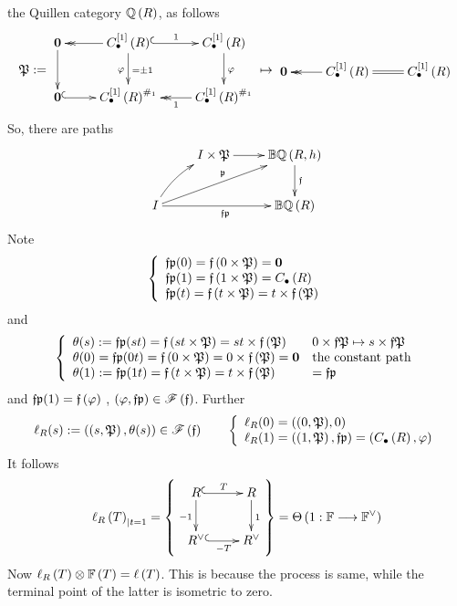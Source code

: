 \documentclass[12pt]{article}
\begin{document}
 the Quillen category  ${\BQ}\LRf{R}$, as follows
 $$
 \P:=
 \diagram 
 {\bf 0} \ar[d]  & {C}^{\LRt{1}}_{\bul}\LRf{{R}}\ar[d]_{\varphi}^{=\pm 1}\ar@{->>}[l] \ar@{^(->}[r]^1& {C}^{\LRt{1}}_{\bul}\LRf{{R}}\ar[d]^{\varphi}\\
 {\bf 0}\ar@{^(->}[r] & {C}^{\LRt{1}}_{\bul}\LRf{{R}}^{\#_1} & {C}^{\LRt{1}}_{\bul}\LRf{{R}}^{\#_1}\ar@{->>}[l]^1\\
 \enddiagram 
 \mapsto 
  \diagram 
 {\bf 0}   & {C}^{\LRt{1}}_{\bul}\LRf{{R}}\ar@{->>}[l] \ar@{=}[r]& {C}^{\LRt{1}}_{\bul}\LRf{{R}}\\
 \enddiagram 
 $$
 So, there are paths 
 $$
 \diagram
&  I \times \P \ar[r] & {\BB}{\BQ}\LRf{R, h} \ar[d]^{\f}\\
 I \ar@/^/[ru]\ar[rru]^{\p}\ar[rr]_{\f\p}  &&  {\BB}{\BQ}\LRf{R}\\
 \enddiagram 
 $$
 Note 
$$
\LBrace{{l}
\f\p(0)=\f\LRf{0\times \P}={\bf 0}\\
\f\p(1)=\f\LRf{1\times \P}=C_{\bul}\LRf{R}\\
\f\p(t)=\f\LRf{t\times \P}=t\times \f\LRf{\P}\\
}
$$
and 
$$
\LBrace{{ll}
\theta(s):=\f\p(st)=\f\LRf{st\times \P}=st\times \f\LRf{\P} &0\times \f\P \mapsto s\times \f\P\\
\theta(0)=\f\p(0t)=\f\LRf{0\times \P}=0\times \f\LRf{\P}={\bf 0} & {\rm the ~constant~path}\\
\theta(1):=\f\p(1t)=\f\LRf{t\times \P}=t\times \f\LRf{\P}&=\f\p\\
}
$$
 and $\f\p(1)=\f\LRf{\varphi}$ , $\LRf{\varphi, \f\p} \in {\SF}\LRf{\f}$. Further
 $$
\ell_R(s):= \LRf{\LRf{s, \P}, \theta(s)}\in {\SF}\LRf{\f}\qquad 
\LBrace{{l}
\ell_R(0)= \LRf{(0, \P), 0}\\
\ell_R(1)= \LRf{\LRf{1, \P}, \f\p}=\LRf{C_{\bul}\LRf{R}, \varphi}\\
}
 $$
It follows
$$
\ell_R\LRf{T}_{|t=1}=\LRs{\diagram 
R\ar@{^(->}[r]^T\ar[d]_{-1} & R\ar[d]^1\\
R^{\vee} \ar@{^(->}[r]_{-T} & R^{\vee}\\
\enddiagram}=\Theta\LRf{1:{\BF} \lra {\BF}^{\vee}}
$$
 Now $\ell_R\LRf{T}\otimes {\BF}\LRf{T}=\ell\LRf{T}$. This is because the process is same, while the 
 terminal point of the latter is isometric to zero. 
 
\end{document}
